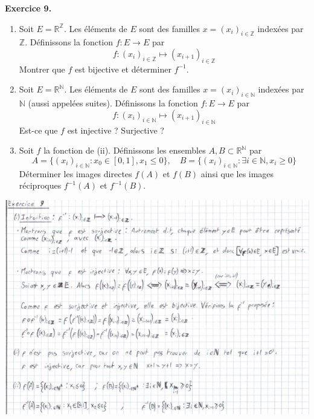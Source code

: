 \documentclass[a4paper, 10pt]{report}
\begin{document}
	\newpage
	
	\noindent
	\textbf{Exercice 9.}
	
	\begin{enumerate}[label=(\roman*)]
		\item Soit $E = \mathbb{R}^{\mathbb{Z}}$. Les éléments de $E$
		sont des familles $x = (x_i)_{i \in \mathbb{Z}}$ indexées par
		$\mathbb{Z}$. Définissons la fonction $f : E \to E$ par
		\[
		f : (x_i)_{i \in \mathbb{Z}} \mapsto (x_{i+1})_{i \in \mathbb{Z}}
		\]
		Montrer que $f$ est bijective et déterminer $f^{-1}$.
		\item Soit $E = \mathbb{R}^{\mathbb{N}}$. Les éléments de $E$
		sont des familles $x = (x_i)_{i \in \mathbb{N}}$ indexées par
		$\mathbb{N}$ (aussi appelées suites).
		Définissons la fonction $f : E \to E$ par
		\[
		f : (x_i)_{i \in \mathbb{N}} \mapsto (x_{i+1})_{i \in \mathbb{N}}
		\]
		Est-ce que $f$ est injective ? Surjective ?
		\item Soit $f$ la fonction de (ii). Définissons les ensembles
		$A, B \subset \mathbb{R}^{\mathbb{N}}$ par
		\[
		A = \{(x_i)_{i \in \mathbb{N}} : x_0 \in [0,1], x_1 \leq 0\},
		\quad
		B = \{(x_i)_{i \in \mathbb{N}} : \exists i \in \mathbb{N}, x_i \geq 0\}
		\]
		Déterminer les images directes $f(A)$ et $f(B)$ ainsi que les
		images réciproques $f^{-1}(A)$ et $f^{-1}(B)$.
	\end{enumerate}
		
	\includegraphics{ex09.jpg}
		
\end{document}
